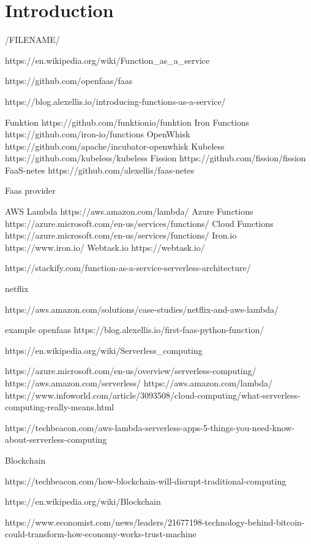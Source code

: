 
\chapter{Introduction}
/FILENAME/



https://en.wikipedia.org/wiki/Function_as_a_service

https://github.com/openfaas/faas

https://blog.alexellis.io/introducing-functions-as-a-service/


Funktion  https://github.com/funktionio/funktion
Iron Functions https://github.com/iron-io/functions
OpenWhisk https://github.com/apache/incubator-openwhisk
Kubeless https://github.com/kubeless/kubeless
Fission https://github.com/fission/fission
FaaS-netes https://github.com/alexellis/faas-netes

Faas provider

AWS Lambda https://aws.amazon.com/lambda/
Azure Functions https://azure.microsoft.com/en-us/services/functions/
Cloud Functions https://azure.microsoft.com/en-us/services/functions/
Iron.io https://www.iron.io/
Webtask.io https://webtask.io/



https://stackify.com/function-as-a-service-serverless-architecture/

netflix

https://aws.amazon.com/solutions/case-studies/netflix-and-aws-lambda/


example openfaas
https://blog.alexellis.io/first-faas-python-function/

https://en.wikipedia.org/wiki/Serverless_computing


https://azure.microsoft.com/en-us/overview/serverless-computing/
https://aws.amazon.com/serverless/
https://aws.amazon.com/lambda/
https://www.infoworld.com/article/3093508/cloud-computing/what-serverless-computing-really-means.html

https://techbeacon.com/aws-lambda-serverless-apps-5-things-you-need-know-about-serverless-computing


Blockchain

https://techbeacon.com/how-blockchain-will-disrupt-traditional-computing

https://en.wikipedia.org/wiki/Blockchain

https://www.economist.com/news/leaders/21677198-technology-behind-bitcoin-could-transform-how-economy-works-trust-machine